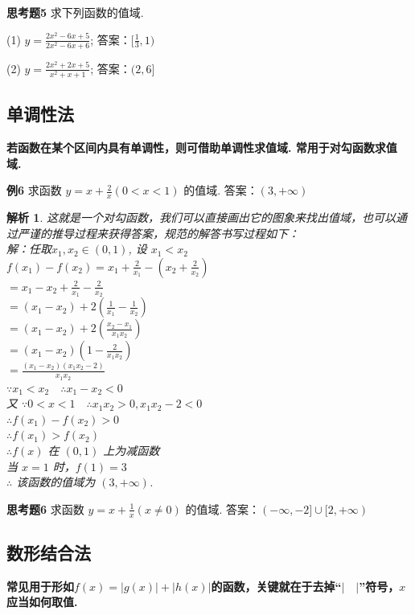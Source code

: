 \documentclass{article}
\theoremstyle{plain}
\newtheorem{aly}{解析}
\begin{document}
\textbf{思考题5} 求下列函数的值域.

(1) $y=\frac{2x^2-6x+5}{2x^2-6x+6}$; \hspace{25pt} 答案：$[\frac{1}{3}, 1)$

(2) $y=\frac{2x^2+2x+5}{x^2+x+1}$; \hspace{25pt} 答案：$(2, 6]$


\subsection{单调性法}
\textbf{若函数在某个区间内具有单调性，则可借助单调性求值域. 常用于对勾函数求值域. }

\textbf{例6} 求函数 $y=x+\frac{2}{x} (0 < x < 1)$ 的值域. \hspace{25pt} 答案：$(3, +\infty)$

\begin{aly}
  这就是一个对勾函数，我们可以直接画出它的图象来找出值域，也可以通过严谨的推导过程来获得答案，规范的解答书写过程如下：\\
  解：任取$x_1,x_2 \in (0,1)$, 设 $x_1 < x_2$\\
  $f(x_1)-f(x_2)=x_1+\frac{2}{x_1}-(x_2+\frac{2}{x_2})$ \\
       $=x_1-x_2+\frac{2}{x_1}-\frac{2}{x_2}$\\
       $=(x_1-x_2)+2(\frac{1}{x_1}-\frac{1}{x_2})$\\
       $=(x_1-x_2)+2(\frac{x_2-x_1}{x_1x_2})$\\
       $=(x_1-x_2)(1-\frac{2}{x_1x_2})$\\
       $=\frac{(x_1-x_2)(x_1x_2-2)}{x_1x_2}$\\
  $\because x_1 <x_2 \quad \therefore x_1-x_2 < 0$\\
  又 $\because 0 < x < 1 \quad \therefore x_1x_2 > 0, x_1x_2-2 < 0$\\
  $\therefore f(x_1)-f(x_2) > 0$\\
  $\therefore f(x_1) > f(x_2)$\\
  $\therefore f(x)$ 在 $(0,1)$ 上为减函数\\
  当 $x=1$ 时，$f(1)=3$\\
  $\therefore$ 该函数的值域为 $(3, +\infty)$.
\end{aly}

\textbf{思考题6} 求函数 $y=x+\frac{1}{x}(x\neq 0)$ 的值域. \hspace{25pt} 答案：$(-\infty, -2]\cup [2, +\infty)$


\subsection{数形结合法}
\textbf{常见用于形如$f(x)=|g(x)|+|h(x)|$的函数，关键就在于去掉“$|\quad|$”符号，$x$ 应当如何取值. }
\end{document}
